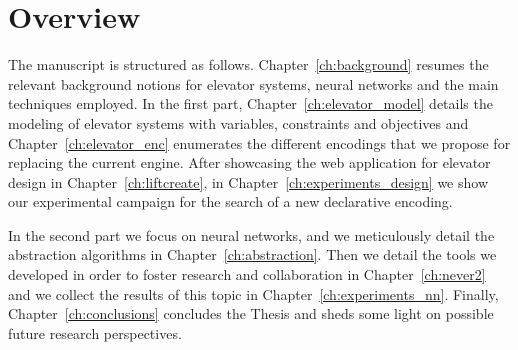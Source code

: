 \section{Overview}
\label{sec:overview}

The manuscript is structured as follows. Chapter~\ref{ch:background} resumes the
relevant background notions for elevator systems, neural networks and the main
techniques employed. In the first part, Chapter~\ref{ch:elevator_model} details
the modeling of elevator systems with variables, constraints and objectives and
Chapter~\ref{ch:elevator_enc} enumerates the different encodings that we propose
for replacing the current engine. After showcasing the web application for 
elevator design in Chapter~\ref{ch:liftcreate}, in Chapter~\ref{ch:experiments_design}
we show our experimental campaign for the search of a new declarative encoding.

In the second part we focus on neural networks, and we meticulously detail the
abstraction algorithms in Chapter~\ref{ch:abstraction}. Then we detail the tools
we developed in order to foster research and collaboration in Chapter~\ref{ch:never2}
and we collect the results of this topic in Chapter~\ref{ch:experiments_nn}.
Finally, Chapter~\ref{ch:conclusions} concludes the Thesis and sheds some light on
possible future research perspectives.